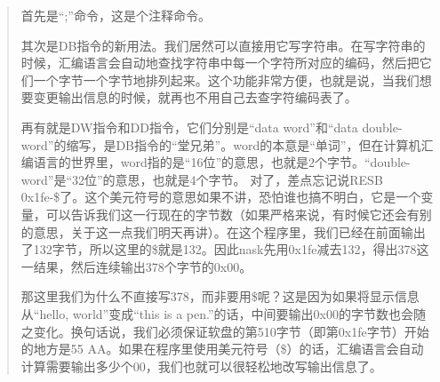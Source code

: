 \begin{quote}
首先是“;”命令，这是个注释命令。

其次是DB指令的新用法。我们居然可以直接用它写字符串。在写字符串的时候，汇编语言会自动地查找字符串中每一个字符所对应的编码，然后把它们一个字节一个字节地排列起来。这个功能非常方便，也就是说，当我们想要变更输出信息的时候，就再也不用自己去查字符编码表了。

再有就是DW指令和DD指令，它们分别是“data word”和“data double-word”的缩写，是DB指令的“堂兄弟”。word的本意是“单词”，但在计算机汇编语言的世界里，word指的是“16位”的意思，也就是2个字节。“double-word”是“32位”的意思，也就是4个字节。
对了，差点忘记说RESB 0x1fe-\$了。这个美元符号的意思如果不讲，恐怕谁也搞不明白，它是一个变量，可以告诉我们这一行现在的字节数（如果严格来说，有时候它还会有别的意思，关于这一点我们明天再讲）。在这个程序里，我们已经在前面输出了132字节，所以这里的\$就是132。因此nask先用0x1fe减去132，得出378这一结果，然后连续输出378个字节的0x00。

那这里我们为什么不直接写378，而非要用\$呢？这是因为如果将显示信息从“hello, world”变成“this is a pen.”的话，中间要输出0x00的字节数也会随之变化。换句话说，我们必须保证软盘的第510字节（即第0x1fe字节）开始的地方是55 AA。如果在程序里使用美元符号（\$）的话，汇编语言会自动计算需要输出多少个00，我们也就可以很轻松地改写输出信息了。
\end{quote}